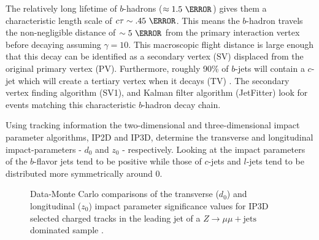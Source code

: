 The relatively long lifetime of $b$-hadrons ($\approx 1.5~\ps$) gives them a
characteristic length scale of  $c\tau \sim .45~\mm$. This means the $b$-hadron
travels the non-negligible distance of $\sim 5~\mm$  from the primary
interaction vertex before decaying assuming $\gamma = 10$.  This macroscopic
flight distance is large enough that this decay can be identified as a
secondary vertex (SV) displaced from the original primary vertex (PV).
Furthermore, roughly 90\% of $b$-jets will contain a $c$-jet which will create
a tertiary vertex when it decays (TV) \cite{Chisholm:bjet}.  The secondary
vertex finding algorithm (SV1), and Kalman filter algorithm (JetFitter) look
for events matching this characteristic $b$-hadron decay chain. 

Using tracking information the two-dimensional and three-dimensional impact
parameter algorithms, IP2D and IP3D, determine the transverse and longitudinal
impact-parameters - $d_{\text{0}}$ and $z_{\text{0}}$ - respectively. Looking
at  the impact parameters of
the $b$-flavor jets tend to be positive while those of $c$-jets and $l$-jets
tend to be distributed more symmetrically around 0.

\begin{figure}[!htbp]
  \centering
   \hfill

  \caption{Data-Monte Carlo comparisons of the
transverse ($d_{0}$) and longitudinal ($z_{0}$) impact parameter significance
values for IP3D selected charged tracks in the leading jet of a $Z\to\mu\mu +
\text{jets}$ dominated sample \cite{Chisholm:bjet}.}
  \label{sec:objects:impact_parameters}
\end{figure}

